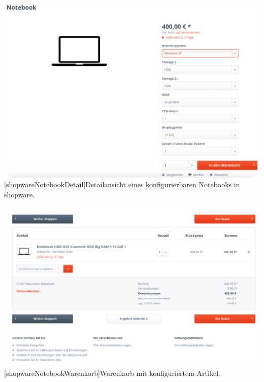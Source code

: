 \begin{appendix}
\vspace{1em}
\begin{minipage}{\linewidth}
	\centering
	\includegraphics[width=1\linewidth]{Abbildungen/shopwareNotebookDetail.png}
	[shopwareNotebookDetail]{Detailansicht eines konfigurierbaren Notebooks in shopware.}
	\label{app:shopwareNotebookDetail}
\end{minipage}
\vspace{1em}

\vspace{1em}
\begin{minipage}{\linewidth}
	\centering
	\includegraphics[width=1\linewidth]{Abbildungen/shopwareNotebookWarenkorb.png}
	[shopwareNotebookWarenkorb]{Warenkorb mit konfiguriertem Artikel.}
	\label{app:shopwareNotebookWarenkorb}
\end{minipage}
\vspace{1em}

\end{appendix}